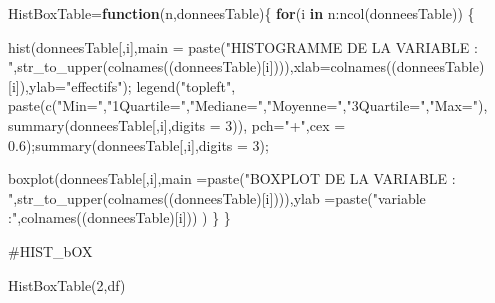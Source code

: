 \documentclass[
]{article}
\newenvironment{Shaded}{\begin{snugshade}}{\end{snugshade}}
\newcommand{\AttributeTok}[1]{\textcolor[rgb]{0.77,0.63,0.00}{#1}}
\newcommand{\ControlFlowTok}[1]{\textcolor[rgb]{0.13,0.29,0.53}{\textbf{#1}}}
\newcommand{\DecValTok}[1]{\textcolor[rgb]{0.00,0.00,0.81}{#1}}
\newcommand{\FloatTok}[1]{\textcolor[rgb]{0.00,0.00,0.81}{#1}}
\newcommand{\FunctionTok}[1]{\textcolor[rgb]{0.00,0.00,0.00}{#1}}
\newcommand{\NormalTok}[1]{#1}
\newcommand{\OtherTok}[1]{\textcolor[rgb]{0.56,0.35,0.01}{#1}}
\newcommand{\SpecialCharTok}[1]{\textcolor[rgb]{0.00,0.00,0.00}{#1}}
\newcommand{\StringTok}[1]{\textcolor[rgb]{0.31,0.60,0.02}{#1}}
\begin{document}
\begin{Shaded}
\begin{Highlighting}[]
\NormalTok{HistBoxTable}\OtherTok{=}\ControlFlowTok{function}\NormalTok{(n,donneesTable)\{}
\ControlFlowTok{for}\NormalTok{(i }\ControlFlowTok{in}\NormalTok{ n}\SpecialCharTok{:}\FunctionTok{ncol}\NormalTok{(donneesTable)) \{}
  
    \FunctionTok{hist}\NormalTok{(donneesTable[,i],}\AttributeTok{main =} \FunctionTok{paste}\NormalTok{(}\StringTok{"HISTOGRAMME DE  LA VARIABLE : "}\NormalTok{,}\FunctionTok{str\_to\_upper}\NormalTok{(}\FunctionTok{colnames}\NormalTok{((donneesTable)[i]))),}\AttributeTok{xlab=}\FunctionTok{colnames}\NormalTok{((donneesTable)[i]),}\AttributeTok{ylab=}\StringTok{"effectifs"}\NormalTok{);}
    \FunctionTok{legend}\NormalTok{(}\StringTok{"topleft"}\NormalTok{, }\FunctionTok{paste}\NormalTok{(}\FunctionTok{c}\NormalTok{(}\StringTok{"Min="}\NormalTok{,}\StringTok{"1Quartile="}\NormalTok{,}\StringTok{"Mediane="}\NormalTok{,}\StringTok{"Moyenne="}\NormalTok{,}\StringTok{"3Quartile="}\NormalTok{,}\StringTok{"Max="}\NormalTok{), }\FunctionTok{summary}\NormalTok{(donneesTable[,i],}\AttributeTok{digits =} \DecValTok{3}\NormalTok{)), }\AttributeTok{pch=}\StringTok{"+"}\NormalTok{,}\AttributeTok{cex =} \FloatTok{0.6}\NormalTok{);}\FunctionTok{summary}\NormalTok{(donneesTable[,i],}\AttributeTok{digits =} \DecValTok{3}\NormalTok{);}
  
    \FunctionTok{boxplot}\NormalTok{(donneesTable[,i],}\AttributeTok{main =}\FunctionTok{paste}\NormalTok{(}\StringTok{"BOXPLOT DE LA VARIABLE : "}\NormalTok{,}\FunctionTok{str\_to\_upper}\NormalTok{(}\FunctionTok{colnames}\NormalTok{((donneesTable)[i]))),}\AttributeTok{ylab =}\FunctionTok{paste}\NormalTok{(}\StringTok{"variable :"}\NormalTok{,}\FunctionTok{colnames}\NormalTok{((donneesTable)[i])) )}
\NormalTok{  \}}
\NormalTok{\}}
\end{Highlighting}
\end{Shaded}

\#HIST\_bOX

\begin{Shaded}
\begin{Highlighting}[]
\FunctionTok{HistBoxTable}\NormalTok{(}\DecValTok{2}\NormalTok{,df)}
\end{Highlighting}
\end{Shaded}
\end{document}
